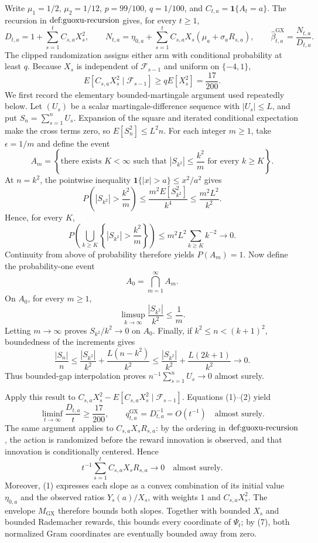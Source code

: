 Write \(\mu _1=1/2\), \(\mu _2=1/12\), \(p=99/100\), \(q=1/100\), and \(C_{t,a}=\mathbf 1\{A_t=a\}\).  The recursion in \(\textnormal{def:guoxu-recursion}\) gives, for every \(t\geq 1\),
\[
 D_{t,a}=1+\sum_{s=1}^t C_{s,a}X_s^2,\qquad
 N_{t,a}=\eta_{0,a}+\sum_{s=1}^t C_{s,a}X_s(\mu_a+\sigma_aR_{s,a}),\qquad
 \widehat\beta^{\mathrm{GX}}_{t,a}=\frac{N_{t,a}}{D_{t,a}}. \tag{1}
\]
The clipped randomization assigns either arm with conditional probability at least \(q\).  Because \(X_s\) is independent of \(\mathcal F_{s-1}\) and uniform on \(\{-4,1\}\),
\[
 E[C_{s,a}X_s^2\mid\mathcal F_{s-1}]
 \geq qE[X_s^2]=\frac{17}{200}. \tag{2}
\]
We first record the elementary bounded-martingale argument used repeatedly below.  Let \((U_s)\) be a scalar martingale-difference sequence with \(|U_s|\leq L\), and put \(S_n=\sum_{s=1}^nU_s\).  Expansion of the square and iterated conditional expectation make the cross terms zero, so \(E[S_n^2]\leq L^2n\).  For each integer \(m\geq1\), take \(\epsilon=1/m\) and define the event
\[
 A_m=\left\{\text{there exists }K<\infty\text{ such that }
 |S_{k^2}|\leq \frac{k^2}{m}\text{ for every }k\geq K\right\}. \tag{3}
\]
At \(n=k^2\), the pointwise inequality \(\mathbf 1\{|x|>a\}\leq x^2/a^2\) gives
\[
 P\left(|S_{k^2}|>\frac{k^2}{m}\right)
 \leq \frac{m^2E[S_{k^2}^2]}{k^4}
 \leq \frac{m^2L^2}{k^2}. \tag{4}
\]
Hence, for every \(K\),
\[
 P\left(\bigcup_{k\geq K}\left\{|S_{k^2}|>\frac{k^2}{m}\right\}\right)
 \leq m^2L^2\sum_{k\geq K}k^{-2}\longrightarrow0.
\]
Continuity from above of probability therefore yields \(P(A_m)=1\).  Now define the probability-one event
\[
 A_0=\bigcap_{m=1}^{\infty}A_m. \tag{5}
\]
On \(A_0\), for every \(m\geq1\),
\[
 \limsup_{k\to\infty}\frac{|S_{k^2}|}{k^2}\leq\frac1m.
\]
Letting \(m\to\infty\) proves \(S_{k^2}/k^2\to0\) on \(A_0\).  Finally, if \(k^2\leq n<(k+1)^2\), boundedness of the increments gives
\[
 \frac{|S_n|}{n}
 \leq \frac{|S_{k^2}|}{k^2}+\frac{L(n-k^2)}{k^2}
 \leq \frac{|S_{k^2}|}{k^2}+\frac{L(2k+1)}{k^2}\longrightarrow0. \tag{6}
\]
Thus bounded-gap interpolation proves \(n^{-1}\sum_{s=1}^nU_s\to0\) almost surely.

Apply this result to \(C_{s,a}X_s^2-E[C_{s,a}X_s^2\mid\mathcal F_{s-1}]\).  Equations (1)--(2) yield
\[
 \liminf_{t\to\infty}\frac{D_{t,a}}t\geq\frac{17}{200},
 \qquad q^{\mathrm{GX}}_{t,a}=D_{t,a}^{-1}=O(t^{-1})
 \quad\text{almost surely}. \tag{7}
\]
The same argument applies to \(C_{s,a}X_sR_{s,a}\): by the ordering in \(\textnormal{def:guoxu-recursion}\), the action is randomized before the reward innovation is observed, and that innovation is conditionally centered.  Hence
\[
 t^{-1}\sum_{s=1}^tC_{s,a}X_sR_{s,a}\longrightarrow0
 \quad\text{almost surely}. \tag{8}
\]
Moreover, (1) expresses each slope as a convex combination of its initial value \(\eta_{0,a}\) and the observed ratios \(Y_s(a)/X_s\), with weights \(1\) and \(C_{s,a}X_s^2\).  The envelope \(M_{\mathrm{GX}}\) therefore bounds both slopes.  Together with bounded \(X_s\) and bounded Rademacher rewards, this bounds every coordinate of \(\Psi_t\); by (7), both normalized Gram coordinates are eventually bounded away from zero.

